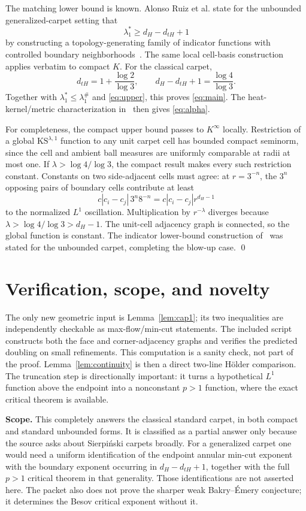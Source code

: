 \documentclass[10pt]{article}
\newcommand{\KS}{\mathrm{KS}}
\begin{document}
The matching lower bound is known.  Alonso Ruiz et al. state for the
unbounded generalized-carpet setting that
\[
 \lambda_1^*\geq d_H-d_{tH}+1
\]
by constructing a topology-generating family of indicator functions with
controlled boundary neighborhoods~\cite[Section~5.4]{ABCRST3}.  The same
local cell-basis construction applies verbatim to compact $K$.  For the
classical carpet,
\[
 d_{tH}=1+\frac{\log2}{\log3},
 \qquad d_H-d_{tH}+1=\frac{\log4}{\log3}.
\]
Together with $\lambda_1^*\leq\lambda_1^\#$ and \eqref{eq:upper}, this proves
\eqref{eq:main}.  The heat-kernel/metric characterization in~\cite{ABCRST3}
then gives \eqref{eq:alpha}.

For completeness, the compact upper bound passes to $K^\infty$ locally.
Restriction of a global $\KS^{\lambda,1}$ function to any unit carpet cell
has bounded compact seminorm, since the cell and ambient ball measures are
uniformly comparable at radii at most one.  If $\lambda>\log4/\log3$, the
compact result makes every such restriction constant.  Constants on two
side-adjacent cells must agree: at $r=3^{-n}$, the $3^n$ opposing pairs of
boundary cells contribute at least
\[
 c|c_i-c_j|\,3^n8^{-n}=c|c_i-c_j|r^{d_H-1}
\]
to the normalized $L^1$ oscillation.  Multiplication by $r^{-\lambda}$
diverges because $\lambda>\log4/\log3>d_H-1$.  The unit-cell adjacency graph
is connected, so the global function is constant.  The indicator lower-bound
construction of~\cite{ABCRST3} was stated for the unbounded carpet, completing
the blow-up case. \qed

\section{Verification, scope, and novelty}

The only new geometric input is Lemma~\ref{lem:cap1}; its two inequalities
are independently checkable as max-flow/min-cut statements.  The included
script constructs both the face and corner-adjacency graphs and verifies the
predicted doubling on small refinements.  This computation is a sanity check,
not part of the proof.  Lemma~\ref{lem:continuity} is then a direct two-line
H\"older comparison.  The truncation step is directionally important: it
turns a hypothetical $L^1$ function above the endpoint into a nonconstant
$p>1$ function, where the exact critical theorem is available.

\textbf{Scope.} This completely answers the classical standard carpet, in
both compact and standard unbounded forms.  It is classified as a partial
answer only because the source asks about Sierpi\'nski carpets broadly.  For a
generalized carpet one would need a uniform identification of the endpoint
annular min-cut exponent with the boundary exponent occurring in
$d_H-d_{tH}+1$, together with the full $p>1$ critical theorem in that
generality.  Those identifications are not asserted here.  The packet also
does not prove the sharper weak Bakry--\'Emery conjecture; it determines the
Besov critical exponent without it.
\end{document}

